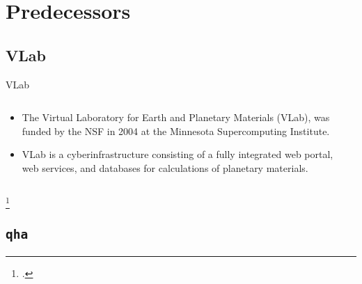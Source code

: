 \section{Predecessors}

\subsection{VLab}

\begin{frame}{VLab}
    \begin{columns}[t]
        \begin{column}[T, onlytextwidth]{0.4\textwidth} %
            \begin{itemize}
                \item The Virtual Laboratory for Earth and Planetary Materials
                      (VLab)\footnotemark, was
                      funded by the NSF in 2004 at the Minnesota Supercomputing Institute.
                \item VLab is a cyberinfrastructure consisting of a fully integrated web
                      portal, web services, and databases for \ab{} calculations of
                      planetary materials.
            \end{itemize}
        \end{column}

        \begin{column}[T]{0.6\textwidth}
        \end{column}
    \end{columns}
    \footcitetext{DASILVA2007321}

\end{frame}

\subsection{\texttt{qha}}

